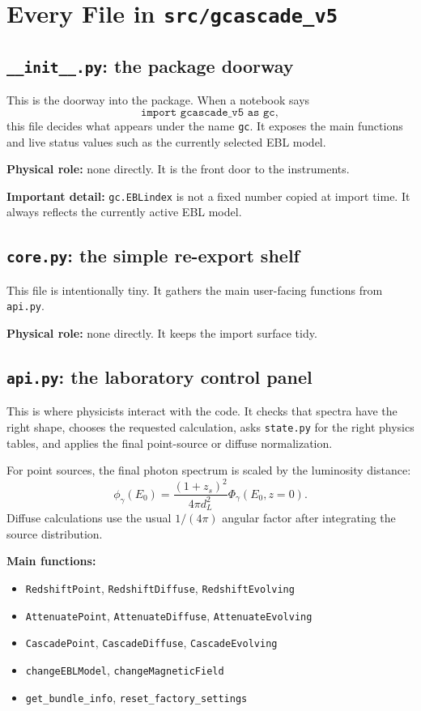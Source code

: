 \documentclass[11pt]{article}
\newcommand{\code}[1]{\texttt{#1}}
\begin{document}
\newpage
\section{Every File in \code{src/gcascade\_v5}}

\subsection{\code{\_\_init\_\_.py}: the package doorway}

This is the doorway into the package. When a notebook says
\[
  \code{import gcascade\_v5 as gc},
\]
this file decides what appears under the name \code{gc}. It exposes the main
functions and live status values such as the currently selected EBL model.

\textbf{Physical role:} none directly. It is the front door to the instruments.

\textbf{Important detail:} \code{gc.EBLindex} is not a fixed number copied at
import time. It always reflects the currently active EBL model.

\subsection{\code{core.py}: the simple re-export shelf}

This file is intentionally tiny. It gathers the main user-facing functions from
\code{api.py}.

\textbf{Physical role:} none directly. It keeps the import surface tidy.

\subsection{\code{api.py}: the laboratory control panel}

This is where physicists interact with the code. It checks that spectra have
the right shape, chooses the requested calculation, asks \code{state.py} for
the right physics tables, and applies the final point-source or diffuse
normalization.

For point sources, the final photon spectrum is scaled by the luminosity
distance:
\[
  \phi_\gamma(E_0)
  =
  \frac{(1+z_s)^2}{4\pi d_L^2}
  \Phi_\gamma(E_0,z=0).
\]
Diffuse calculations use the usual $1/(4\pi)$ angular factor after integrating
the source distribution.

\textbf{Main functions:}
\begin{itemize}
  \item \code{RedshiftPoint}, \code{RedshiftDiffuse}, \code{RedshiftEvolving}
  \item \code{AttenuatePoint}, \code{AttenuateDiffuse}, \code{AttenuateEvolving}
  \item \code{CascadePoint}, \code{CascadeDiffuse}, \code{CascadeEvolving}
  \item \code{changeEBLModel}, \code{changeMagneticField}
  \item \code{get\_bundle\_info}, \code{reset\_factory\_settings}
\end{itemize}
\end{document}
